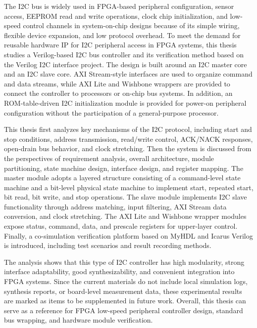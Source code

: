 The I2C bus is widely used in FPGA-based peripheral configuration,
sensor access, EEPROM read and write operations, clock chip
initialization, and low-speed control channels in system-on-chip designs
because of its simple wiring, flexible device expansion, and low
protocol overhead. To meet the demand for reusable hardware IP for I2C
peripheral access in FPGA systems, this thesis studies a Verilog-based
I2C bus controller and its verification method based on the Verilog I2C
interface project. The design is built around an I2C master core and an
I2C slave core. AXI Stream-style interfaces are used to organize command
and data streams, while AXI Lite and Wishbone wrappers are provided to
connect the controller to processors or on-chip bus systems. In
addition, an ROM-table-driven I2C initialization module is provided for
power-on peripheral configuration without the participation of a
general-purpose processor.

This thesis first analyzes key mechanisms of the I2C protocol, including
start and stop conditions, address transmission, read/write control,
ACK/NACK responses, open-drain bus behavior, and clock stretching. Then
the system is discussed from the perspectives of requirement analysis,
overall architecture, module partitioning, state machine design,
interface design, and register mapping. The master module adopts a
layered structure consisting of a command-level state machine and a
bit-level physical state machine to implement start, repeated start, bit
read, bit write, and stop operations. The slave module implements I2C
slave functionality through address matching, input filtering, AXI
Stream data conversion, and clock stretching. The AXI Lite and Wishbone
wrapper modules expose status, command, data, and prescale registers for
upper-layer control. Finally, a co-simulation verification platform
based on MyHDL and Icarus Verilog is introduced, including test
scenarios and result recording methods.

The analysis shows that this type of I2C controller has high modularity,
strong interface adaptability, good synthesizability, and convenient
integration into FPGA systems. Since the current materials do not
include local simulation logs, synthesis reports, or board-level
measurement data, these experimental results are marked as items to be
supplemented in future work. Overall, this thesis can serve as a
reference for FPGA low-speed peripheral controller design, standard bus
wrapping, and hardware module verification.
